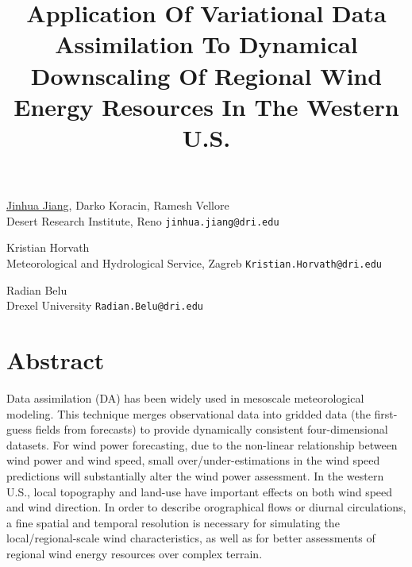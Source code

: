 \title{Application Of Variational Data Assimilation To Dynamical Downscaling Of Regional Wind Energy Resources In The Western U.S.}
\author{} \institute{}
\maketitle

\begin{center}
\vspace{-6mm}
{\large \underline{Jinhua Jiang}, Darko Koracin, Ramesh Vellore}\\
Desert Research Institute, Reno 
{\tt jinhua.jiang@dri.edu}\\
\vspace{4mm}

{\large Kristian Horvath}\\
Meteorological and Hydrological Service, Zagreb 
{\tt Kristian.Horvath@dri.edu}
\vspace{4mm}

{\large Radian Belu}\\
Drexel University 
{\tt Radian.Belu@dri.edu}
\end{center}

\section*{Abstract}
Data assimilation (DA) has been widely used in mesoscale meteorological modeling. This technique merges observational data into gridded data (the first-guess fields from forecasts) to provide dynamically consistent four-dimensional datasets. For wind power forecasting, due to the non-linear relationship between wind power and wind speed, small over/under-estimations in the wind speed predictions will substantially alter the wind power assessment. In the western U.S., local topography and land-use have important effects on both wind speed and wind direction. In order to describe orographical flows or diurnal circulations, a fine spatial and temporal resolution is necessary for simulating the local/regional-scale wind characteristics, as well as for better assessments of regional wind energy resources over complex terrain. 

